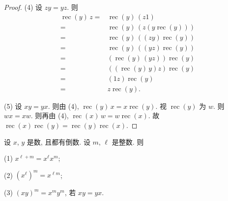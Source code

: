 \documentclass[../libro.tex]{subfiles}
\begin{document}
\begin{proof}
    (4)
    设 \(z y = y z\).
    则
    \begin{align*}
        \operatorname{rec} {(y)}\, z
        = {} &
        \operatorname{rec} {(y)}\,
        (z 1)
        \\
        = {} &
        \operatorname{rec} {(y)}\,
        (z (y \operatorname{rec} {(y)}))
        \\
        = {} &
        \operatorname{rec} {(y)}\,
        ((z y) \operatorname{rec} {(y)})
        \\
        = {} &
        \operatorname{rec} {(y)}\,
        ((y z) \operatorname{rec} {(y)})
        \\
        = {} &
        (\operatorname{rec} {(y)}\, (y z))
        \operatorname{rec} {(y)}
        \\
        = {} &
        ((\operatorname{rec} {(y)}\, y) z)
        \operatorname{rec} {(y)}
        \\
        = {} &
        (1 z) \operatorname{rec} {(y)}
        \\
        = {} &
        z \operatorname{rec} {(y)}.
    \end{align*}

    (5)
    设 \(x y = y x\).
    则由 (4),
    \(\operatorname{rec} {(y)}\, x
    = x \operatorname{rec} {(y)}\).
    视 \(\operatorname{rec} {(y)}\) 为 \(w\).
    则 \(w x = x w\).
    则再由 (4),
    \(\operatorname{rec} {(x)}\, w
    = w \operatorname{rec} {(x)}\).
    故
    \(\operatorname{rec} {(x)} \operatorname{rec} {(y)}
    = \operatorname{rec} {(y)} \operatorname{rec} {(x)}\).
\end{proof}

\clearpage

\begin{theorem}
    设 \(x\), \(y\) 是数, 且都有倒数.
    设 \(m\), \(\ell\) 是整数.
    则

    (1)
    \(x^{\ell+m} = x^{\ell} x^{m}\);

    (2)
    \((x^{\ell})^{m} = x^{\ell m}\);

    (3)
    \((x y)^{m} = x^m y^m\), 若 \(x y = y x\).
\end{theorem}
\end{document}
